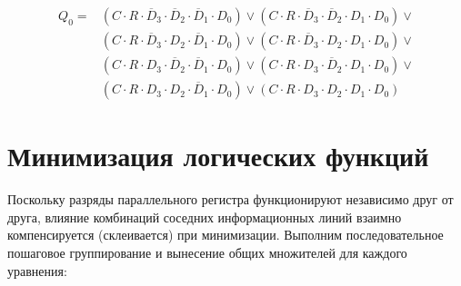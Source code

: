 \documentclass[oneside,a4paper,14pt]{extarticle}
\begin{document}
\begin{align*}
  Q_0 = {} & (C \cdot R \cdot \overline{D}_3 \cdot \overline{D}_2 \cdot \overline{D}_1 \cdot D_0) \vee
             (C \cdot R \cdot \overline{D}_3 \cdot \overline{D}_2 \cdot D_1 \cdot D_0) \vee \\
           & (C \cdot R \cdot \overline{D}_3 \cdot D_2 \cdot \overline{D}_1 \cdot D_0) \vee
             (C \cdot R \cdot \overline{D}_3 \cdot D_2 \cdot D_1 \cdot D_0) \vee \\
           & (C \cdot R \cdot D_3 \cdot \overline{D}_2 \cdot \overline{D}_1 \cdot D_0) \vee
             (C \cdot R \cdot D_3 \cdot \overline{D}_2 \cdot D_1 \cdot D_0) \vee \\
           & (C \cdot R \cdot D_3 \cdot D_2 \cdot \overline{D}_1 \cdot D_0) \vee
             (C \cdot R \cdot D_3 \cdot D_2 \cdot D_1 \cdot D_0)
\end{align*}

\section{Минимизация логических функций}
Поскольку разряды параллельного регистра функционируют независимо друг от друга, влияние комбинаций соседних информационных линий взаимно компенсируется (склеивается) при минимизации. Выполним последовательное пошаговое группирование и вынесение общих множителей для каждого уравнения:
\end{document}
